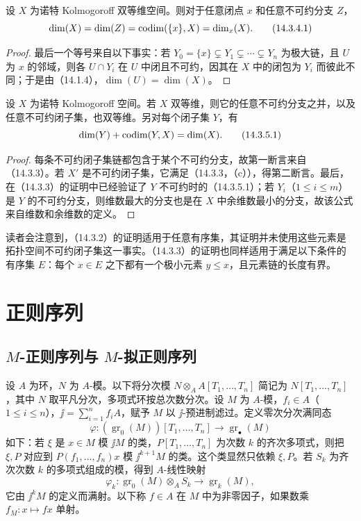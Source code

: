 设 $X$ 为诺特 Kolmogoroff 双等维空间。则对于任意闭点 $x$ 和任意不可约分支 $Z$，
\begin{equation}
 \dim(X)=\dim(Z)=\operatorname{codim}(\{x\},X)=\dim_x(X).\tag{14.3.4.1}
\end{equation}
\begin{proof}
最后一个等号来自以下事实：若
$Y_0=\{x\}\subsetneq Y_1\subsetneq\cdots\subsetneq Y_n$
为极大链，且 $U$ 为 $x$ 的邻域，则各 $U\cap Y_i$ 在 $U$ 中闭且不可约，因其在 $X$ 中的闭包为 $Y_i$ 而彼此不同；于是由（14.1.4），$\dim(U)=\dim(X)$。
\end{proof}

设 $X$ 为诺特 Kolmogoroff 空间。若 $X$ 双等维，则它的任意不可约分支之并，以及任意不可约闭子集，也双等维。另对每个闭子集 $Y$，有
\begin{equation}
 \dim(Y)+\operatorname{codim}(Y,X)=\dim(X).\tag{14.3.5.1}
\end{equation}

\begin{proof}
每条不可约闭子集链都包含于某个不可约分支，故第一断言来自（14.3.3）。若 $X'$ 是不可约闭子集，它满足（14.3.3，（c）），得第二断言。最后，在（14.3.3）的证明中已经验证了 $Y$ 不可约时的（14.3.5.1）；若 $Y_i$（$1\leq i\leq m$）是 $Y$ 的不可约分支，则维数最大的分支也是在 $X$ 中余维数最小的分支，故该公式来自维数和余维数的定义。
\end{proof}

读者会注意到，（14.3.2）的证明适用于任意有序集，其证明并未使用这些元素是拓扑空间不可约闭子集这一事实。（14.3.3）的证明也同样适用于满足以下条件的有序集 $E$：每个 $x\in E$ 之下都有一个极小元素 $y\leq x$，且元素链的长度有界。

\section{正则序列}
\subsection{\texorpdfstring{$M$}{M}-正则序列与 \texorpdfstring{$M$}{M}-拟正则序列}
设 $A$ 为环，$N$ 为 $A$-模。以下将分次模 $N\otimes_AA[T_1,\ldots,T_n]$ 简记为 $N[T_1,\ldots,T_n]$，其中 $N$ 取平凡分次，多项式环按总次数分次。设 $M$ 为 $A$-模，$f_i\in A$（$1\leq i\leq n$），$\jj=\sum_{i=1}^nf_iA$，赋予 $M$ 以 $\jj$-预进制滤过。定义零次分次满同态
\begin{equation}
 \varphi:(\operatorname{gr}_0(M))[T_1,\ldots,T_n]
 \longrightarrow\operatorname{gr}_\bullet(M)\tag{15.1.1.1}
\end{equation}
如下：若 $\xi$ 是 $x\in M$ 模 $\jj M$ 的类，$P[T_1,\ldots,T_n]$ 为次数 $k$ 的齐次多项式，则把 $\xi,P$ 对应到 $P(f_1,\ldots,f_n)x$ 模 $\jj^{k+1}M$ 的类。这个类显然只依赖 $\xi,P$。若 $S_k$ 为齐次次数 $k$ 的多项式组成的模，得到 $A$-线性映射
\[
 \varphi_k:\operatorname{gr}_0(M)\otimes_AS_k\longrightarrow\operatorname{gr}_k(M),
\]
它由 $\jj^kM$ 的定义而满射。以下称 $f\in A$ 在 $M$ 中为非零因子，如果数乘 $f_M:x\mapsto fx$ 单射。


